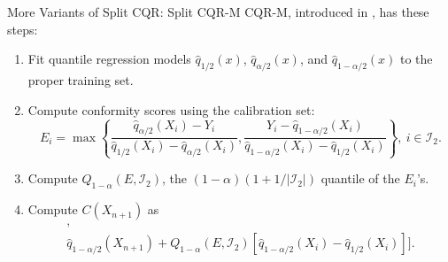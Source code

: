 \documentclass{beamer}
\begin{document}
\begin{frame}{More Variants of Split CQR: Split CQR-M}
    CQR-M, introduced in \cite{kivaranovic2020adap}, has these steps:
    \begin{enumerate}
        \item Fit quantile regression models $\widehat{q}_{1 / 2}(x)$, $\widehat{q}_{\alpha / 2}(x)$, and $\widehat{q}_{1 - \alpha / 2}(x)$ to the proper training set.
        \item Compute conformity scores using the calibration set:
        \[
        E_i = \max\left\{\frac{\widehat{q}_{\alpha / 2}(X_i) - Y_i}{\widehat{q}_{1 / 2}(X_i) - \widehat{q}_{\alpha / 2}(X_i)}, \frac{Y_i - \widehat{q}_{1 - \alpha / 2}(X_i)}{\widehat{q}_{1 - \alpha / 2}(X_i) - \widehat{q}_{1 / 2}(X_i)}\right\}, \ i \in \mathcal{I}_2.
        \]
        \item Compute $Q_{1 - \alpha}(E, \mathcal{I}_2)$, the $(1 - \alpha)(1 + 1 / |\mathcal{I}_2|)$ quantile of the $E_i$'s.
        \item Compute $C(X_{n + 1})$ as
        \begin{multline*}
            [\widehat{q}_{\alpha / 2}(X_{n + 1}) - Q_{1 - \alpha}(E, \mathcal{I}_2)
               [\widehat{q}_{1 / 2}(X_i) - \widehat{q}_{\alpha / 2}(X_i)], \\
            \widehat{q}_{1 - \alpha / 2}(X_{n + 1}) + Q_{1 - \alpha}(E, \mathcal{I}_2)
               [\widehat{q}_{1 - \alpha / 2}(X_i) - \widehat{q}_{1 / 2}(X_i)]].
        \end{multline*}
    \end{enumerate}
\end{frame}
\end{document}
